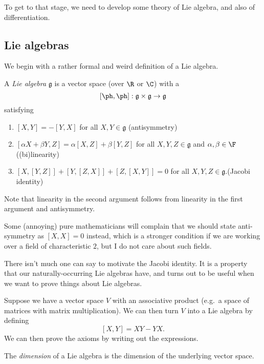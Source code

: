 \documentclass[a4paper]{article}
\begin{document}
To get to that stage, we need to develop some theory of Lie algebra, and also of differentiation.

\subsection{Lie algebras}
We begin with a rather formal and weird definition of a Lie algebra.

\begin{defi}
  A \emph{Lie algebra} $\mathfrak{g}$ is a vector space (over $\R$ or $\C$) with a 
  \[
    [\ph,\ph] : \mathfrak{g} \times \mathfrak{g} \to \mathfrak{g}
  \]
  satisfying
  \begin{enumerate}
    \item $[X, Y] = -[Y, X]$ for all $X, Y \in \mathfrak{g}$ \hfill(antisymmetry)
    \item $[\alpha X + \beta Y, Z] = \alpha [X, Z] + \beta [Y, Z]$ for all $X, Y, Z \in \mathfrak{g}$ and $\alpha, \beta \in \F$ \hfill((bi)linearity)
    \item $[X, [Y, Z]] + [Y, [Z, X]] + [Z, [X, Y]] = 0$ for all $X, Y, Z \in \mathfrak{g}$.\hfill(Jacobi identity)
  \end{enumerate}
  Note that linearity in the second argument follows from linearity in the first argument and antisymmetry.
\end{defi}
Some (annoying) pure mathematicians will complain that we should state anti-symmetry as $[X, X] = 0$ instead, which is a stronger condition if we are working over a field of characteristic $2$, but I do not care about such fields.

There isn't much one can say to motivate the Jacobi identity. It is a property that our naturally-occurring Lie algebras have, and turns out to be useful when we want to prove things about Lie algebras.

\begin{eg}
  Suppose we have a vector space $V$ with an associative product (e.g.\ a space of matrices with matrix multiplication). We can then turn $V$ into a Lie algebra by defining
  \[
    [X, Y] = XY - YX.
  \]
  We can then prove the axioms by writing out the expressions.
\end{eg}

\begin{defi}
  The \emph{dimension} of a Lie algebra is the dimension of the underlying vector space.
\end{defi}
\end{document}
